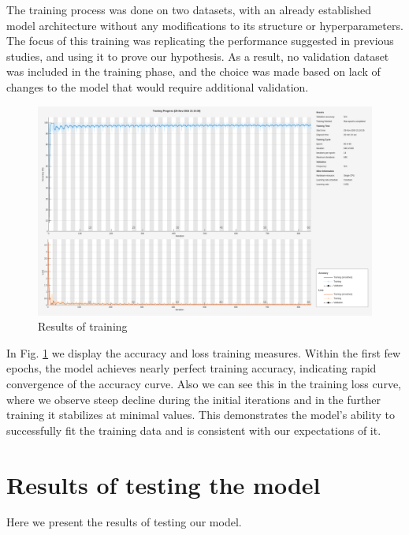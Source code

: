 \documentclass[12pt,a4paper,titlepage,openany]{report}
\begin{document}
The training process was done on two datasets, with an already established model architecture without any modifications to its structure or hyperparameters. The focus of this training was replicating the performance suggested in previous studies, and using it to prove our hypothesis. As a result, no validation dataset was included in the training phase, and the choice was made based on lack of changes to the model that would require additional validation.

\begin{figure}
     \includegraphics[width=1\linewidth]{./new_training/training_chart_new.png}
     \caption{Results of training}
     \label{fig:training}
\end{figure}

In Fig. \ref{fig:training} we display the accuracy and loss training measures. 
Within the first few epochs, the model achieves nearly perfect training accuracy, indicating rapid convergence of the accuracy curve.
Also we can see this in the training loss curve, where we observe steep decline during the initial iterations and in the further training it stabilizes at minimal values.
This demonstrates the model's ability to successfully fit the training data and is consistent with our expectations of it.

\section{Results of testing the model}

Here we present the results of testing our model.
\end{document}
